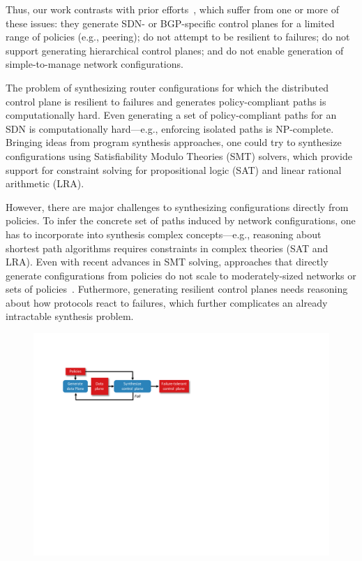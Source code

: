Thus, our work contrasts with prior efforts~\cite{netegg, propane,
  merlin, simple, fattire, netkat, netkatcompiler, sol}, which suffer
from one or more of these issues: they generate SDN- or BGP-specific
control planes for a limited range of policies (e.g., peering); do not
attempt to be resilient to failures; do not support generating
hierarchical control planes; and do not enable generation of
simple-to-manage network configurations. 

The problem of synthesizing router configurations for which the
distributed control plane is resilient to failures and generates
policy-compliant paths is computationally hard. Even
generating a set of policy-compliant paths for an SDN is
computationally hard---e.g., enforcing isolated paths is NP-complete.
Bringing ideas from program synthesis approaches, one could try to 
synthesize configurations using 
Satisfiability Modulo Theories (SMT) solvers, which
provide support for 
constraint solving for propositional logic (SAT)
and linear rational arithmetic (LRA). 

However, there are major challenges 
to synthesizing configurations 
directly from policies.  
To infer the concrete set of paths induced by network
configurations, one has to incorporate into synthesis complex
concepts---e.g., reasoning about shortest path algorithms requires
constraints in complex theories (SAT and LRA). 
Even with recent advances in SMT solving,
approaches that directly generate configurations 
from policies do not scale to 
moderately-sized networks or sets of policies~\cite{synet}. Futhermore,
generating resilient control planes needs reasoning about how
protocols react to failures, which further complicates an
already intractable synthesis problem.

\begin{figure}
	\includegraphics[width=\columnwidth]{figures/architecture.pdf}
	\label{fig:architecture}
\end{figure}


